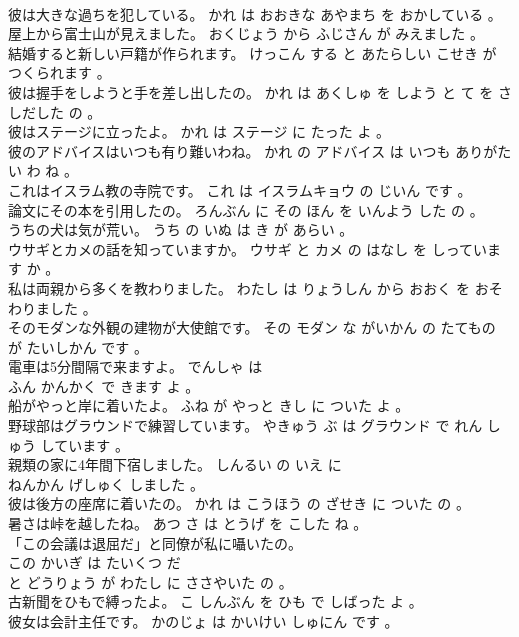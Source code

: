 \documentclass[8pt]{extreport}
\begin{document}
\begin{CJK}{UTF8}{min}
\\	彼は大きな過ちを犯している。	かれ は おおきな あやまち を おかしている 。 
\\	屋上から富士山が見えました。	おくじょう から ふじさん が みえました 。 
\\	結婚すると新しい戸籍が作られます。	けっこん する と あたらしい こせき が つくられます 。 
\\	彼は握手をしようと手を差し出したの。	かれ は あくしゅ を しよう と て を さしだした の 。 
\\	彼はステージに立ったよ。	かれ は ステージ に たった よ 。 
\\	彼のアドバイスはいつも有り難いわね。	かれ の アドバイス は いつも ありがたい わ ね 。 
\\	これはイスラム教の寺院です。	これ は イスラムキョウ の じいん です 。 
\\	論文にその本を引用したの。	ろんぶん に その ほん を いんよう した の 。 
\\	うちの犬は気が荒い。	うち の いぬ は き が あらい 。 
\\	ウサギとカメの話を知っていますか。	ウサギ と カメ の はなし を しっています か 。 
\\	私は両親から多くを教わりました。	わたし は りょうしん から おおく を おそわりました 。 
\\	そのモダンな外観の建物が大使館です。	その モダン な がいかん の たてもの が たいしかん です 。 
\\	電車は5分間隔で来ますよ。	でんしゃ は 
\\	ふん かんかく で きます よ 。 
\\	船がやっと岸に着いたよ。	ふね が やっと きし に ついた よ 。 
\\	野球部はグラウンドで練習しています。	やきゅう ぶ は グラウンド で れん しゅう しています 。 
\\	親類の家に4年間下宿しました。	しんるい の いえ に 
\\	ねんかん げしゅく しました 。 
\\	彼は後方の座席に着いたの。	かれ は こうほう の ざせき に ついた の 。 
\\	暑さは峠を越したね。	あつ さ は とうげ を こした ね 。 
\\	「この会議は退屈だ」と同僚が私に囁いたの。	
\\	この かいぎ は たいくつ だ 
\\	と どうりょう が わたし に ささやいた の 。 
\\	古新聞をひもで縛ったよ。	こ しんぶん を ひも で しばった よ 。 
\\	彼女は会計主任です。	かのじょ は かいけい しゅにん です 。 

\end{CJK}
\end{document}
